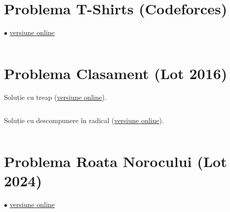 \documentclass[../main.tex]{subfiles}
\begin{document}
\inputminted{cpp}{../src/advanced-ds/reversals-and-sums.cpp}

\section{Problema T-Shirts (Codeforces)}
\label{code:t-shirts}
$\bullet$
\href{https://codeforces.com/contest/702/submission/316973381}{versiune online}

\inputminted{cpp}{../src/advanced-ds/t-shirts.cpp}

\section{Problema Clasament (Lot 2016)}
\label{code:clasament}

Soluție cu treap (\href{https://kilonova.ro/submissions/1072711}{versiune online}).

\inputminted{cpp}{../src/advanced-ds/clasament-treap.cpp}

Soluție cu descompunere în radical (\href{https://kilonova.ro/submissions/1072645}{versiune online}).

\inputminted{cpp}{../src/advanced-ds/clasament-sqrt.cpp}

\section{Problema Roata Norocului (Lot 2024)}
\label{code:roata-norocului}
$\bullet$
\href{https://kilonova.ro/submissions/377556}{versiune online}

\inputminted{cpp}{../src/advanced-ds/roata-norocului.cpp}
\end{document}
